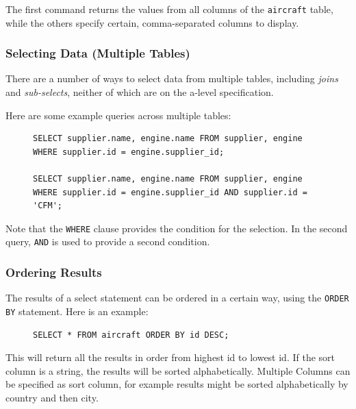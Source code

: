 \documentclass[10pt]{article}
\begin{document}
The first command returns the values from all columns of the \texttt{aircraft} table, while the others specify certain, comma-separated columns to display.

\subsubsection{Selecting Data (Multiple Tables)}
\label{sec:orgcd47a27}

There are a number of ways to select data from multiple tables, including \emph{joins} and \emph{sub-selects}, neither of which are on the a-level specification.

Here are some example queries across multiple tables:

\begin{figure}[H]
\begin{verbatim}
SELECT supplier.name, engine.name FROM supplier, engine WHERE supplier.id = engine.supplier_id;

SELECT supplier.name, engine.name FROM supplier, engine WHERE supplier.id = engine.supplier_id AND supplier.id = 'CFM';
\end{verbatim}
\end{figure}

Note that the \texttt{WHERE} clause provides the condition for the selection. In the second query, \texttt{AND} is used to provide a second condition.

\subsubsection{Ordering Results}
\label{sec:org5e829b0}

The results of a select statement can be ordered in a certain way, using the \texttt{ORDER BY} statement. Here is an example:

\begin{figure}[H]
\begin{verbatim}
SELECT * FROM aircraft ORDER BY id DESC;
\end{verbatim}
\end{figure}

This will return all the results in order from highest id to lowest id. If the sort column is a string, the results will be sorted alphabetically. Multiple Columns can be specified as sort column, for example results might be sorted alphabetically by country and then city.
\end{document}
